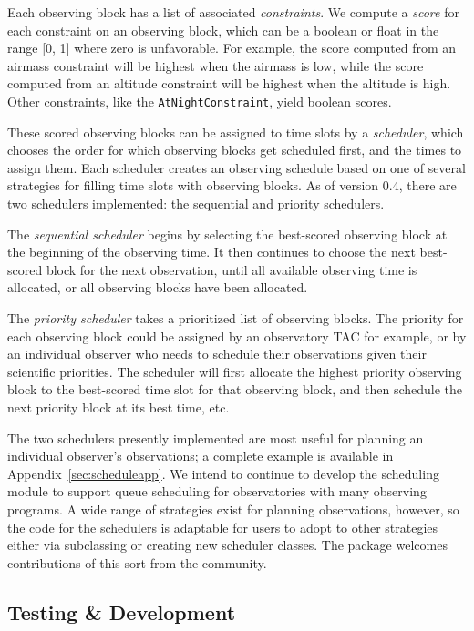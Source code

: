 Each observing block has a list of associated \textit{constraints}. We compute a \textit{score} for each constraint on an observing block, which can be a boolean or float in the range [0, 1] where zero is unfavorable. For example, the score computed from an airmass constraint will be highest when the airmass is low, while the score computed from an altitude constraint will be highest when the altitude is high. Other constraints, like the \texttt{AtNightConstraint}, yield boolean scores.

These scored observing blocks can be assigned to time slots by a \textit{scheduler}, which chooses the order for which observing blocks get scheduled first, and the times to assign them. Each scheduler creates an observing schedule based on one of several strategies for filling time slots with observing blocks. As of \astroplan version 0.4, there are two schedulers implemented: the sequential and priority schedulers. 

The \textit{sequential scheduler} begins by selecting the best-scored observing block at the beginning of the observing time. It then continues to choose the next best-scored block for the next observation, until all available observing time is allocated, or all observing blocks have been allocated. 

The \textit{priority scheduler} takes a prioritized list of observing blocks. The priority for each observing block could be assigned by an observatory TAC for example, or by an individual observer who needs to schedule their observations given their scientific priorities. The scheduler will first allocate the highest priority observing block to the best-scored time slot for that observing block, and then schedule the next priority block at its best time, etc. 

The two schedulers presently implemented are most useful for planning an individual observer's observations; a complete example is available in Appendix~\ref{sec:scheduleapp}. We intend to continue to develop the scheduling module to support queue scheduling for observatories with many observing programs. A wide range of strategies exist for planning observations, however, so the code for the schedulers is adaptable for users to adopt to other strategies either via subclassing or creating new scheduler classes.  The package welcomes contributions of this sort from the community.

\subsection{Testing \& Development}

